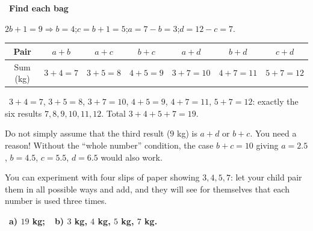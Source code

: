 \documentclass[11pt]{article}
\providecommand{\AnsWord}{Đáp số}
\newcommand{\ans}[1]{\par\smallskip{\bfseries\color{tmGreen!88!black}\AnsWord:}\ {\bfseries\color{AnsRed}#1}\par}
\newcommand{\step}[2]{\par\smallskip\noindent{\bfseries\color{tmBlue!85!black}\StepWord~#1.}\ {\bfseries #2}\par\nopagebreak}
\newcommand{\verify}[1]{\par\smallskip\noindent{\bfseries\color{tmGreen!80!black}\faCheckCircle\ \CheckWord}\ #1\par}
\def\AnsWord{Answer}
\def\StepWord{Step}
\def\CheckWord{Check:}
\begin{document}
{\step{3}{Find each bag}
$2b+1=9\Rightarrow b=4$;\quad $c=b+1=5$;\quad $a=7-b=3$;\quad $d=12-c=7$.
\begin{center}
\begin{tabular}{|c|c|c|c|c|c|c|}
\hline
\rowcolor{tmBlue!10} Pair & $a+b$ & $a+c$ & $b+c$ & $a+d$ & $b+d$ & $c+d$\\ \hline
Sum (kg) & $3+4=7$ & $3+5=8$ & $4+5=9$ & $3+7=10$ & $4+7=11$ & $5+7=12$\\ \hline
\end{tabular}
\end{center}
\verify{$3+4=7$, $3+5=8$, $3+7=10$, $4+5=9$, $4+7=11$, $5+7=12$: exactly the six results $7,8,9,10,11,12$. Total $3+4+5+7=19$.}
\begin{warnbox}Do not simply assume that the third result ($9$ kg) is $a+d$ or $b+c$. You need a reason! Without the ``whole number'' condition, the case $b+c=10$ giving $a=2.5$, $b=4.5$, $c=5.5$, $d=6.5$ would also work.\end{warnbox}
\begin{parentbox}You can experiment with four slips of paper showing $3,4,5,7$: let your child pair them in all possible ways and add, and they will see for themselves that each number is used three times.\end{parentbox}
\ans{a) $19$ kg;\ \ b) $3$ kg, $4$ kg, $5$ kg, $7$ kg.}
}

\providecommand{\rvabShp}[3]{%
  \if#1T\draw[tmBlue!80!black,line width=0.8pt,fill=tmBlue!18] (#2,#3)--(#2+0.34,#3)--(#2+0.17,#3+0.3)--cycle;\fi
  \if#1C\draw[tmOrange!85!black,line width=0.8pt,fill=tmOrange!22] (#2+0.15,#3+0.15) circle (0.15);\fi
  \if#1S\draw[tmGreen!80!black,line width=0.8pt,fill=tmGreen!18] (#2,#3) rectangle (#2+0.3,#3+0.3);\fi
  \if#1D\draw[tmPurple!85!black,line width=0.8pt,fill=tmPurple!18] (#2+0.13,#3)--(#2+0.26,#3+0.16)--(#2+0.13,#3+0.32)--(#2,#3+0.16)--cycle;\fi
  \if#1Q\node[font=\Large\bfseries,text=Ink,inner sep=0pt,anchor=south] at (#2+0.15,#3) {?};\fi}
\providecommand{\rvabTri}{\tikz[baseline=0pt]{\rvabShp{T}{0}{0}}}
\providecommand{\rvabCir}{\tikz[baseline=0pt]{\rvabShp{C}{0}{0}}}
\providecommand{\rvabSq}{\tikz[baseline=0pt]{\rvabShp{S}{0}{0}}}
\providecommand{\rvabDia}{\tikz[baseline=0pt]{\rvabShp{D}{0}{0}}}
\providecommand{\rvabRow}[3]{%
  \foreach \rvabS [count=\rvabI] in {#1}{\xdef\rvabN{\rvabI}}%
  \foreach \rvabS [count=\rvabI] in {#1}{\rvabShp{\rvabS}{#2-0.19*\rvabN+0.38*\rvabI-0.36}{#3+0.03}}}
\providecommand{\rvabScale}[4]{\begin{scope}[shift={(#1,#2)}]
  \draw[Ink,line width=1pt] (-1.9,0.55)--(-0.5,0.55) (-1.2,0.55)--(-1.2,0.25)--(1.2,0.25)--(1.2,0.55) (0.5,0.55)--(1.9,0.55);
  \draw[Ink,line width=0.9pt,fill=Ink!12] (-0.2,-0.12)--(0,0.25)--(0.2,-0.12)--cycle;
  \rvabRow{#3}{-1.2}{0.55}\rvabRow{#4}{1.2}{0.55}
\end{scope}}
\end{document}
